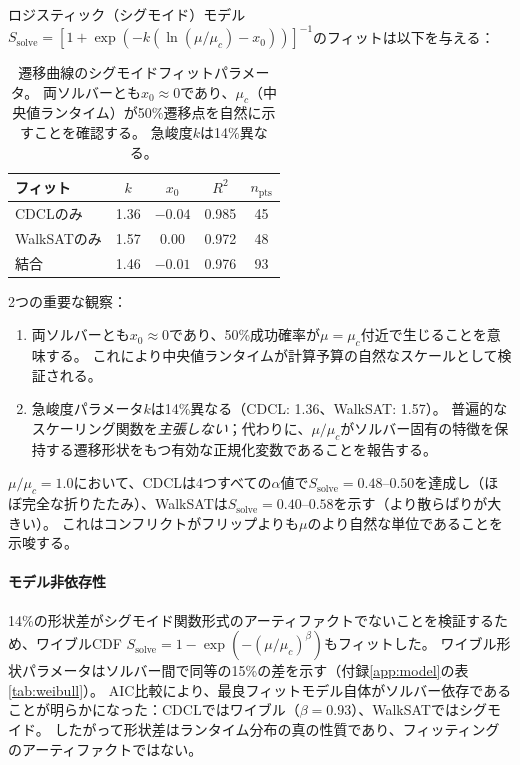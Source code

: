 \documentclass[11pt,a4paper]{article}
\newcommand{\mc}{\mu_c}
\newcommand{\Ssolve}{S_{\text{solve}}}
\begin{document}
ロジスティック（シグモイド）モデル$\Ssolve = [1 + \exp(-k(\ln(\mu/\mc) - x_0))]^{-1}$のフィットは以下を与える：

\begin{table}[h]
\centering
\begin{tabular}{lcccc}
\toprule
フィット & $k$ & $x_0$ & $R^2$ & $n_{\text{pts}}$ \\
\midrule
CDCLのみ     & 1.36 & $-0.04$ & 0.985 & 45 \\
WalkSATのみ  & 1.57 & $ 0.00$ & 0.972 & 48 \\
結合      & 1.46 & $-0.01$ & 0.976 & 93 \\
\bottomrule
\end{tabular}
\caption{遷移曲線のシグモイドフィットパラメータ。
両ソルバーとも$x_0 \approx 0$であり、$\mc$（中央値ランタイム）が50\%遷移点を自然に示すことを確認する。
急峻度$k$は14\%異なる。}
\label{tab:sigmoid}
\end{table}

2つの重要な観察：
\begin{enumerate}
\item 両ソルバーとも$x_0 \approx 0$であり、50\%成功確率が$\mu = \mc$付近で生じることを意味する。
  これにより中央値ランタイムが計算予算の自然なスケールとして検証される。
\item 急峻度パラメータ$k$は14\%異なる（CDCL: 1.36、WalkSAT: 1.57）。
  普遍的なスケーリング関数を\emph{主張しない}；代わりに、$\mu/\mc$がソルバー固有の特徴を保持する遷移形状をもつ有効な正規化変数であることを報告する。
\end{enumerate}

$\mu/\mc = 1.0$において、CDCLは4つすべての$\alpha$値で$\Ssolve = 0.48$--$0.50$を達成し（ほぼ完全な折りたたみ）、WalkSATは$\Ssolve = 0.40$--$0.58$を示す（より散らばりが大きい）。
これはコンフリクトがフリップよりも$\mu$のより自然な単位であることを示唆する。

\paragraph{モデル非依存性}
14\%の形状差がシグモイド関数形式のアーティファクトでないことを検証するため、ワイブルCDF $\Ssolve = 1 - \exp(-(\mu/\mc)^\beta)$もフィットした。
ワイブル形状パラメータはソルバー間で同等の15\%の差を示す（付録\ref{app:model}の表\ref{tab:weibull}）。
AIC比較により、最良フィットモデル自体がソルバー依存であることが明らかになった：CDCLではワイブル（$\beta = 0.93$）、WalkSATではシグモイド。
したがって形状差はランタイム分布の真の性質であり、フィッティングのアーティファクトではない。
\end{document}
